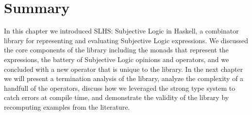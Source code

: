 \documentclass[thesis.tex]{subfiles}
\begin{document}
\section{Summary}

In this chapter we introduced SLHS: Subjective Logic in Haskell, a combinator library
for representing and evaluating Subjective Logic expressions. We discussed the core
components of the library including the monads that represent the expressions, the
battery of Subjective Logic opinions and operators, and we concluded with a new operator
that is unique to the library. In the next chapter we will present a termination
analysis of the library, analyze the complexity of a handfull of the operators, discuss
how we leveraged the strong type system to catch errors at compile time, and demonstrate
the validity of the library by recomputing examples from the literature.
\end{document}

